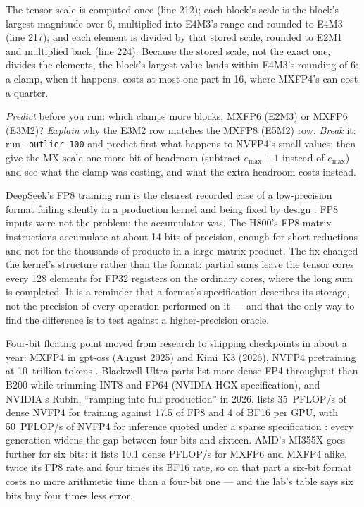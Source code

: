 \noindent The tensor scale is computed once (line 212); each block's scale is the
block's largest magnitude over 6, multiplied into E4M3's range and rounded to
E4M3 (line 217); and each element is divided by that stored scale, rounded to
E2M1 and multiplied back (line 224). Because the stored scale, not the exact
one, divides the elements, the block's largest value lands within E4M3's
rounding of 6: a clamp, when it happens, costs at most one part in 16, where
MXFP4's can cost a quarter.

\emph{Predict} before you run: which clamps more blocks, MXFP6 (E2M3) or
MXFP6 (E3M2)? \emph{Explain} why the E3M2 row matches the MXFP8 (E5M2) row.
\emph{Break} it: run \texttt{--outlier 100} and predict first what happens to
NVFP4's small values; then give the MX scale one more bit of headroom
(subtract $e_{\max} + 1$ instead of $e_{\max}$) and see what the clamp was
costing, and what the extra headroom costs instead.


DeepSeek's FP8 training run is the clearest recorded case of a low-precision
format failing silently in a production kernel and being fixed by design
\cite{deepseek2024v3}. FP8 inputs were not the problem; the accumulator was.
The H800's FP8 matrix instructions accumulate at about 14 bits of precision,
enough for short reductions and not for the thousands of products in a
large matrix product. The fix changed the kernel's structure rather than the
format: partial sums leave the tensor cores every 128 elements for FP32
registers on the ordinary cores, where the long sum is completed. It is a
reminder that a format's specification describes its storage, not the
precision of every operation performed on it --- and that the only way to find
the difference is to test against a higher-precision oracle.


Four-bit floating point moved from research to shipping checkpoints in about a
year: MXFP4 in gpt-oss (August 2025) and Kimi~K3 (2026), NVFP4 pretraining
at 10~trillion tokens \cite{nvidia2025nvfp4pretrain}. Blackwell Ultra parts
list more dense FP4 throughput than B200 while trimming INT8 and FP64 (NVIDIA
HGX specification), and NVIDIA's Rubin, ``ramping into full production'' in
2026, lists 35~PFLOP/s of
dense NVFP4 for training against 17.5 of FP8 and 4 of BF16 per GPU, with
50~PFLOP/s of NVFP4 for inference quoted under a sparse specification
\cite{nvidia2026verarubin}: every generation widens the gap between four bits
and sixteen. AMD's MI355X goes further for six bits: it lists 10.1 dense
PFLOP/s for MXFP6 and MXFP4 alike, twice its FP8 rate and four times its BF16
rate, so on that part a six-bit format costs no more arithmetic time than a
four-bit one \cite{amd2025mi355x} --- and the lab's table says six bits buy
four times less error.

